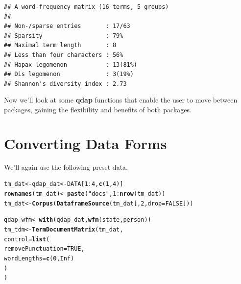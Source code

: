 \documentclass{article}\usepackage[]{graphicx}\usepackage[]{color}
\makeatletter
\newcommand{\hlnum}[1]{\textcolor[rgb]{0.686,0.059,0.569}{#1}}%
\newcommand{\hlstr}[1]{\textcolor[rgb]{0.192,0.494,0.8}{#1}}%
\newcommand{\hlopt}[1]{\textcolor[rgb]{0,0,0}{#1}}%
\newcommand{\hlstd}[1]{\textcolor[rgb]{0.345,0.345,0.345}{#1}}%
\newcommand{\hlkwb}[1]{\textcolor[rgb]{0.69,0.353,0.396}{#1}}%
\newcommand{\hlkwc}[1]{\textcolor[rgb]{0.333,0.667,0.333}{#1}}%
\newcommand{\hlkwd}[1]{\textcolor[rgb]{0.737,0.353,0.396}{\textbf{#1}}}%
\newenvironment{kframe}{%
 \def\at@end@of@kframe{}%
 \ifinner\ifhmode%
  \def\at@end@of@kframe{\end{minipage}}%
  \begin{minipage}{\columnwidth}%
 \fi\fi%
 \def\FrameCommand##1{\hskip\@totalleftmargin \hskip-\fboxsep
 \colorbox{shadecolor}{##1}\hskip-\fboxsep
     \hskip-\linewidth \hskip-\@totalleftmargin \hskip\columnwidth}%
 \MakeFramed {\advance\hsize-\width
   \@totalleftmargin\z@ \linewidth\hsize
   \@setminipage}}%
 {\par\unskip\endMakeFramed%
 \at@end@of@kframe}
\newenvironment{knitrout}{}{} %
\makeatother
\begin{document}
\begin{knitrout}
\color{fgcolor}\begin{kframe}
\begin{verbatim}
## A word-frequency matrix (16 terms, 5 groups)
## 
## Non-/sparse entries       : 17/63
## Sparsity                  : 79%
## Maximal term length       : 8
## Less than four characters : 56%
## Hapax legomenon           : 13(81%)
## Dis legomenon             : 3(19%)
## Shannon's diversity index : 2.73
\end{verbatim}
\end{kframe}
\end{knitrout}


Now we'll look at some \textbf{qdap} functions that enable the user to move between packages, gaining the flexibility and benefits of both packages.


\section{Converting Data Forms}

\hspace{.4cm} We'll again use the following preset data.

\begin{knitrout}
\color{fgcolor}\begin{kframe}
\begin{alltt}
\hlstd{tm_dat} \hlkwb{<-} \hlstd{qdap_dat} \hlkwb{<-} \hlstd{DATA[}\hlnum{1}\hlopt{:}\hlnum{4}\hlstd{,} \hlkwd{c} \hlstd{(}\hlnum{1}\hlstd{,} \hlnum{4}\hlstd{) ]}
\hlkwd{rownames} \hlstd{(tm_dat)} \hlkwb{<-} \hlkwd{paste} \hlstd{(}\hlstr{"docs"}\hlstd{,} \hlnum{1}\hlopt{:} \hlkwd{nrow} \hlstd{(tm_dat))}
\hlstd{tm_dat} \hlkwb{<-} \hlkwd{Corpus} \hlstd{(} \hlkwd{DataframeSource} \hlstd{(tm_dat[,} \hlnum{2}\hlstd{,} \hlkwc{drop}\hlstd{=}\hlnum{FALSE}\hlstd{]))}

\hlstd{qdap_wfm} \hlkwb{<-} \hlkwd{with} \hlstd{(qdap_dat,} \hlkwd{wfm} \hlstd{(state, person))}
\hlstd{tm_tdm} \hlkwb{<-} \hlkwd{TermDocumentMatrix} \hlstd{(tm_dat,}
    \hlkwc{control} \hlstd{=} \hlkwd{list} \hlstd{(}
        \hlkwc{removePunctuation} \hlstd{=} \hlnum{TRUE}\hlstd{,}
        \hlkwc{wordLengths}\hlstd{=} \hlkwd{c} \hlstd{(}\hlnum{0}\hlstd{,} \hlnum{Inf}\hlstd{)}
    \hlstd{)}
\hlstd{)}
\end{alltt}
\end{kframe}
\end{knitrout}
\end{document}
